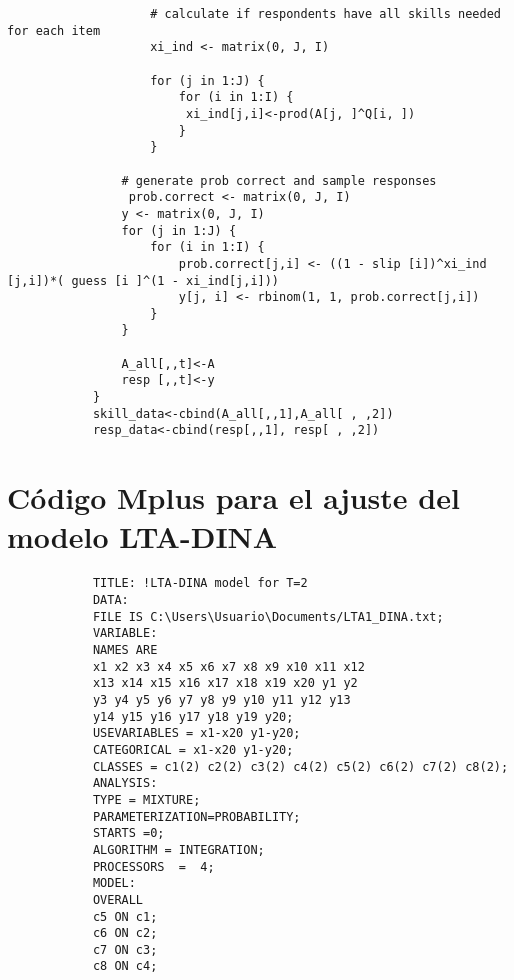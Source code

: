 \begin{lstlisting}
			 		# calculate if respondents have all skills needed for each item
			 		xi_ind <- matrix(0, J, I)
			 		
			 		for (j in 1:J) {
					  	for (i in 1:I) {
					   	 xi_ind[j,i]<-prod(A[j, ]^Q[i, ])
					  	}
				 	}
			 	
			 	# generate prob correct and sample responses
				 prob.correct <- matrix(0, J, I)
			 	y <- matrix(0, J, I)
			 	for (j in 1:J) {
				  	for (i in 1:I) {
					    prob.correct[j,i] <- ((1 - slip [i])^xi_ind [j,i])*( guess [i ]^(1 - xi_ind[j,i]))
				    	y[j, i] <- rbinom(1, 1, prob.correct[j,i])
			    	} 
			    }
			 	
			 	A_all[,,t]<-A
			 	resp [,,t]<-y
			}
			skill_data<-cbind(A_all[,,1],A_all[ , ,2])
			resp_data<-cbind(resp[,,1], resp[ , ,2])
		\end{lstlisting}
	
	\newpage	
	\section*{C\'{o}digo Mplus para el ajuste del modelo LTA-DINA}		
		\begin{verbatim}
			TITLE: !LTA-DINA model for T=2
			DATA:
			FILE IS C:\Users\Usuario\Documents/LTA1_DINA.txt;
			VARIABLE: 
			NAMES ARE
			x1 x2 x3 x4 x5 x6 x7 x8 x9 x10 x11 x12
			x13 x14 x15 x16 x17 x18 x19 x20 y1 y2 
			y3 y4 y5 y6 y7 y8 y9 y10 y11 y12 y13
			y14 y15 y16 y17 y18 y19 y20;
			USEVARIABLES = x1-x20 y1-y20;
			CATEGORICAL = x1-x20 y1-y20;
			CLASSES = c1(2) c2(2) c3(2) c4(2) c5(2) c6(2) c7(2) c8(2);
			ANALYSIS:
			TYPE = MIXTURE;
			PARAMETERIZATION=PROBABILITY;
			STARTS =0;
			ALGORITHM = INTEGRATION;
			PROCESSORS  =  4; 
			MODEL:
			OVERALL
			c5 ON c1;
			c6 ON c2;
			c7 ON c3;
			c8 ON c4;
		\end{verbatim}
		
